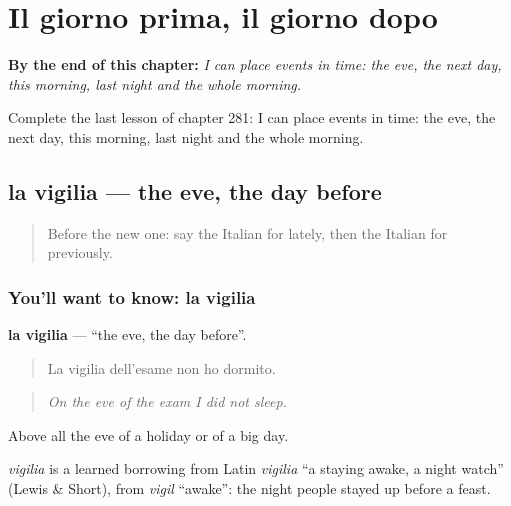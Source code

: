 
\chapter{Il giorno prima, il giorno dopo}
\label{ch:it-il-giorno-prima-il-giorno-dopo}

\begin{chapteropening}
\textbf{By the end of this chapter:} \emph{I can place events in time: the eve, the next day, this morning, last night and the whole morning.}

Complete the last lesson of chapter 281: I can place events in time: the eve, the next day, this morning, last night and the whole morning.
\end{chapteropening}

\section[la vigilia]{la vigilia — the eve, the day before}

\label{lesson:IT-C281-vigilia}



\begin{quote}
Before the new one: say the Italian for lately, then the Italian for previously.
\end{quote}

\subsection*{You'll want to know: la vigilia}
\textbf{la vigilia} — \textquotedblleft{}the eve, the day before\textquotedblright{}.

\begin{quote}
La vigilia dell'esame non ho dormito.
\end{quote}

\begin{quote}
\emph{On the eve of the exam I did not sleep.}
\end{quote}

Above all the eve of a holiday or of a big day.

\begin{cousinweb}
\emph{vigilia} is a learned borrowing from Latin \emph{vigilia} \textquotedblleft{}a staying awake, a night watch\textquotedblright{} (Lewis \& Short), from \emph{vigil} \textquotedblleft{}awake\textquotedblright{}: the night people stayed up before a feast.
\end{cousinweb}

